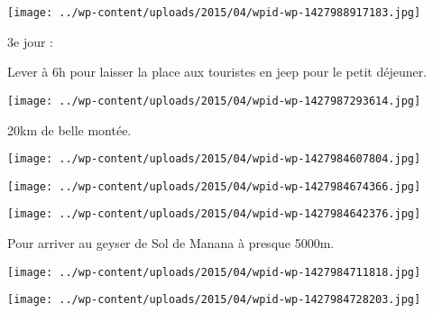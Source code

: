 \begin{center} \texttt{[image: ../wp-content/uploads/2015/04/wpid-wp-1427988917183.jpg]} \end{center}



 3e jour : 

 Lever à 6h pour laisser la place aux touristes en jeep pour le petit déjeuner.

 

\begin{center} \texttt{[image: ../wp-content/uploads/2015/04/wpid-wp-1427987293614.jpg]} \end{center}



 20km de belle montée.

 

\begin{center} \texttt{[image: ../wp-content/uploads/2015/04/wpid-wp-1427984607804.jpg]} \end{center}



 

\begin{center} \texttt{[image: ../wp-content/uploads/2015/04/wpid-wp-1427984674366.jpg]} \end{center}



 

\begin{center} \texttt{[image: ../wp-content/uploads/2015/04/wpid-wp-1427984642376.jpg]} \end{center}



 Pour arriver au geyser de Sol de Manana à presque 5000m.

 

\begin{center} \texttt{[image: ../wp-content/uploads/2015/04/wpid-wp-1427984711818.jpg]} \end{center}



 

\begin{center} \texttt{[image: ../wp-content/uploads/2015/04/wpid-wp-1427984728203.jpg]} \end{center}



 

